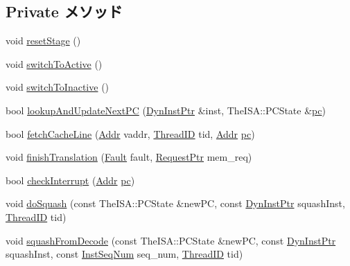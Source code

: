 \subsection*{Private メソッド}
\begin{DoxyCompactItemize}
\item 
void \hyperlink{classDefaultFetch_ada2a699094bc420f977abf2a17ed14c8}{resetStage} ()
\item 
void \hyperlink{classDefaultFetch_a03ce24cba34d3da5948f54e10f8710a9}{switchToActive} ()
\item 
void \hyperlink{classDefaultFetch_a8ef9d48876d3014250c97bfba41a42cd}{switchToInactive} ()
\item 
bool \hyperlink{classDefaultFetch_a033e8df655743382b3cb870600f70f82}{lookupAndUpdateNextPC} (\hyperlink{classDefaultFetch_a028ce10889c5f6450239d9e9a7347976}{DynInstPtr} \&inst, TheISA::PCState \&\hyperlink{classDefaultFetch_a6e6091c9272a281b8693c0f46279cad0}{pc})
\item 
bool \hyperlink{classDefaultFetch_a2ede53ea19a95876fd2418fcc329ef9a}{fetchCacheLine} (\hyperlink{base_2types_8hh_af1bb03d6a4ee096394a6749f0a169232}{Addr} vaddr, \hyperlink{base_2types_8hh_ab39b1a4f9dad884694c7a74ed69e6a6b}{ThreadID} tid, \hyperlink{base_2types_8hh_af1bb03d6a4ee096394a6749f0a169232}{Addr} \hyperlink{classDefaultFetch_a6e6091c9272a281b8693c0f46279cad0}{pc})
\item 
void \hyperlink{classDefaultFetch_ac7dca7de206b6388e989a53b56634ad4}{finishTranslation} (\hyperlink{classRefCountingPtr}{Fault} fault, \hyperlink{classRequest}{RequestPtr} mem\_\-req)
\item 
bool \hyperlink{classDefaultFetch_a0949b3c8e74ae282010e2a8698525c72}{checkInterrupt} (\hyperlink{base_2types_8hh_af1bb03d6a4ee096394a6749f0a169232}{Addr} \hyperlink{classDefaultFetch_a6e6091c9272a281b8693c0f46279cad0}{pc})
\item 
void \hyperlink{classDefaultFetch_a9c960f5de0fbb0511596cba5039660a3}{doSquash} (const TheISA::PCState \&newPC, const \hyperlink{classDefaultFetch_a028ce10889c5f6450239d9e9a7347976}{DynInstPtr} squashInst, \hyperlink{base_2types_8hh_ab39b1a4f9dad884694c7a74ed69e6a6b}{ThreadID} tid)
\item 
void \hyperlink{classDefaultFetch_acddf0ab1e13108e3626da3743de398b8}{squashFromDecode} (const TheISA::PCState \&newPC, const \hyperlink{classDefaultFetch_a028ce10889c5f6450239d9e9a7347976}{DynInstPtr} squashInst, const \hyperlink{inst__seq_8hh_a258d93d98edaedee089435c19ea2ea2e}{InstSeqNum} seq\_\-num, \hyperlink{base_2types_8hh_ab39b1a4f9dad884694c7a74ed69e6a6b}{ThreadID} tid)

\end{DoxyCompactItemize}
